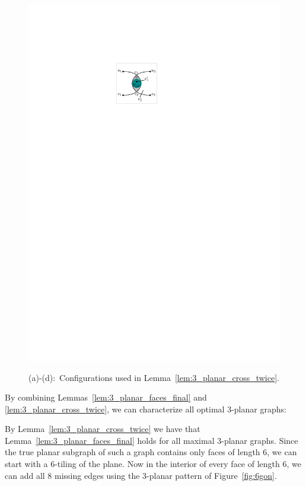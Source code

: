 \begin{figure}[htb]
\begin{minipage}[b]{.24\textwidth}
        \includegraphics[width=\textwidth,page=4]{images/3_planar_cross_twice}
        \subcaption{~}\label{fig:3_planar_cross_twice_main}
    \end{minipage}
    \caption{%
    (a)-(d):~Configurations used in Lemma~\ref{lem:3_planar_cross_twice}.
    \label{fig:3_planar_one_crossing_2}}
\end{figure}

By combining Lemmas~\ref{lem:3_planar_faces_final} and \ref{lem:3_planar_cross_twice}, we can characterize all optimal $3$-planar graphs:


 By Lemma~\ref{lem:3_planar_cross_twice} we have that Lemma~\ref{lem:3_planar_faces_final} holds for all maximal $3$-planar graphs. Since the true planar subgraph of such a graph contains only faces of length $6$, we can start with a $6$-tiling of the plane. Now in the interior of every face of length $6$, we can add all  $8$ missing edges using the $3$-planar pattern of Figure~\ref{fig:6gon}.


